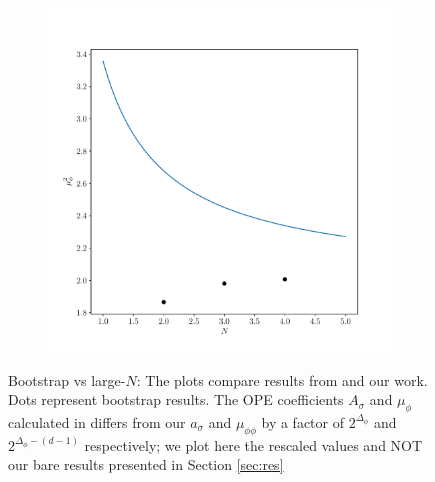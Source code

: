 \documentclass[a4paper,11pt]{article}
\begin{document}
\begin{figure}[H]
\begin{subfigure}{\columnwidth}
    \centering
    \includegraphics[scale=0.5]{muphi_compare.pdf}
\end{subfigure}

\caption{Bootstrap vs large-$N$: The plots compare results from \cite{Max} and our work. Dots represent bootstrap results. The OPE coefficients $A_{\sigma}$ and $\mu_\phi$ calculated in \cite{Max} differs from our $a_{\sigma}$ and $\mu_{\phi\phi}$ by a factor of $2^{\Delta_{\phi}}$ and $2^{\Delta_{\phi}-(d-1)}$ respectively; we plot here the rescaled values and NOT our bare results presented in Section \ref{sec:res} }
\label{fig:compare}
\end{figure}




\end{document}
